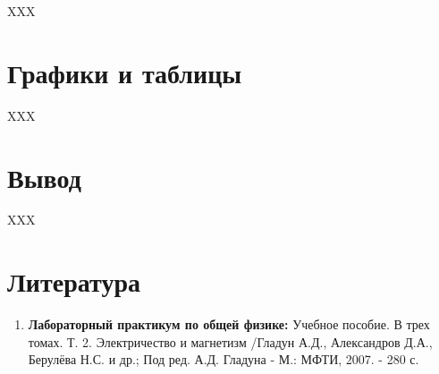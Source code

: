 \documentclass[a4paper, 12pt]{article}%
\begin{document}
XXX

\section{Графики и таблицы}

XXX

\section{Вывод}

XXX

\section{Литература}

\begin{enumerate}
\item \textbf{Лабораторный практикум по общей физике:} Учебное пособие. В трех томах. Т. 2. Электричество и магнетизм /Гладун А.Д., Александров Д.А., Берулёва Н.С. и др.; Под ред. А.Д. Гладуна - М.: МФТИ, 2007. - 280 с.
\end{enumerate}		
		
					
\end{document}
